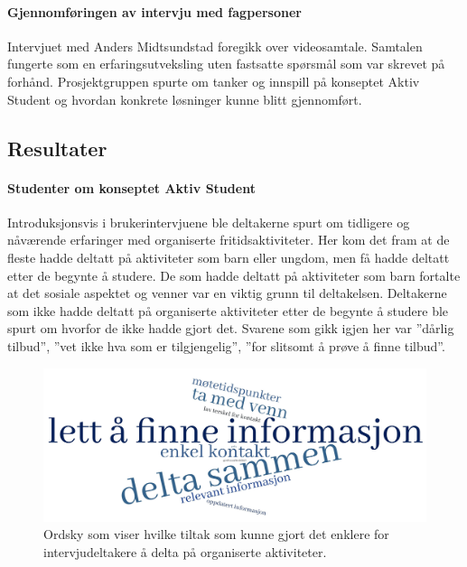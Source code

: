 \paragraph{Gjennomføringen av intervju med fagpersoner}
Intervjuet med Anders Midtsundstad foregikk over videosamtale. Samtalen fungerte som en erfaringsutveksling uten fastsatte spørsmål som var skrevet på forhånd. Prosjektgruppen spurte om tanker og innspill på konseptet Aktiv Student og hvordan konkrete løsninger kunne blitt gjennomført.


\subsection{Resultater}

\paragraph{Studenter om konseptet Aktiv Student}
Introduksjonsvis i brukerintervjuene ble deltakerne spurt om tidligere og nåværende erfaringer med organiserte fritidsaktiviteter. Her kom det fram at de fleste hadde deltatt på aktiviteter som barn eller ungdom, men få hadde deltatt etter de begynte å studere. De som hadde deltatt på aktiviteter som barn fortalte at det sosiale aspektet og venner var en viktig grunn til deltakelsen. Deltakerne som ikke hadde deltatt på organiserte aktiviteter etter de begynte å studere ble spurt om hvorfor de ikke hadde gjort det. Svarene som gikk igjen her var ''dårlig tilbud'', ''vet ikke hva som er tilgjengelig'', ''for slitsomt å prøve å finne tilbud''.

\begin{figure}[H]
\includegraphics[width=\textwidth]{Illustrasjoner/ordsky-tiltak.jpg}
\caption{Ordsky som viser hvilke tiltak som kunne gjort det enklere for intervjudeltakere å delta på organiserte aktiviteter.}
\label{fig:ordsky-tiltak}
\end{figure}

